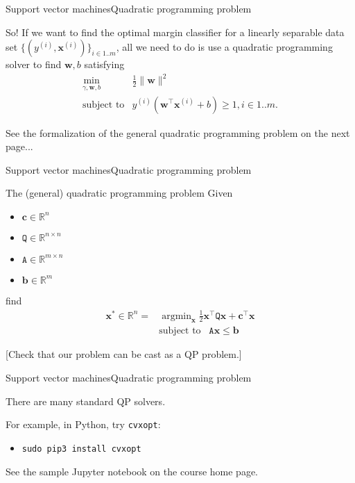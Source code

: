 \documentclass{beamer}
\renewcommand{\vec}[1]{\boldsymbol{#1}}
\newcommand{\mat}[1]{\mathtt{#1}}
\def\Rset{\mathbb{R}}
\DeclareMathOperator*{\argmin}{argmin}
\begin{document}
\begin{frame}{Support vector machines}{Quadratic programming problem}

  So! If we want to find the \alert{optimal margin classifier} for a linearly
  separable data set $\{(y^{(i)},\vec{x}^{(i)})\}_{i \in 1..m}$, all we need to
  do is use a quadratic programming solver to find $\vec{w},b$ satisfying
  \[
  \begin{array}{rl}
    \min_{\gamma,\vec{w},b} & \frac{1}{2} \| \vec{w} \|^2 \\
    \text{subject to} & y^{(i)}(\vec{w}^\top\vec{x}^{(i)} + b) \ge 1, i \in 1..m .
  \end{array}
  \]

  See the formalization of the 
  general quadratic programming problem on the
  next page...

\end{frame}


\begin{frame}{Support vector machines}{Quadratic programming problem}

  \begin{block}{The (general) \alert{quadratic programming} problem}
    Given
    \begin{itemize}
    \item $\vec{c} \in \Rset^n$
    \item $\mat{Q} \in \Rset^{n\times n}$
    \item $\mat{A} \in \Rset^{m\times n}$
    \item $\vec{b} \in \Rset^m$
    \end{itemize}
    find \[ \begin{array}{rl}
      \vec{x}^* \in \Rset^n = & \argmin_{\vec{x}} \frac{1}{2} \vec{x}^\top \mat{Q} \vec{x} + \vec{c}^\top \vec{x} \\
      & \text{subject to} \;\;\; \mat{A}\vec{x}\le \vec{b}
    \end{array} \]
  \end{block}

  [Check that our problem can be cast as a QP problem.]
  
\end{frame}


\begin{frame}{Support vector machines}{Quadratic programming problem}

  There are many standard QP solvers.

  \medskip

  For example, in Python, try \texttt{cvxopt}:
  \begin{itemize}
  \item \texttt{sudo pip3 install cvxopt}
  \end{itemize}
  See the sample Jupyter notebook on the course home page.

\end{frame}
\end{document}
